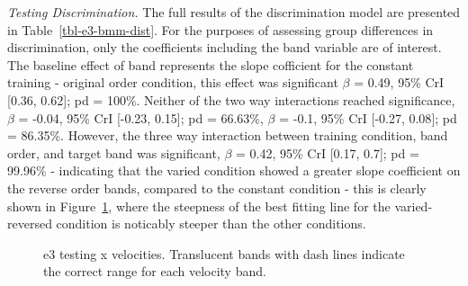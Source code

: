 \documentclass[
  12pt,
  letterpaper,
]{article}
\begin{document}
\emph{Testing Discrimination.} The full results of the discrimination
model are presented in Table~\ref{tbl-e3-bmm-dist}. For the purposes of
assessing group differences in discrimination, only the coefficients
including the band variable are of interest. The baseline effect of band
represents the slope cofficient for the constant training - original
order condition, this effect was significant \(\beta\) = 0.49, 95\% CrI
{[}0.36, 0.62{]}; pd = 100\%. Neither of the two way interactions
reached significance, \(\beta\) = -0.04, 95\% CrI {[}-0.23, 0.15{]}; pd
= 66.63\%, \(\beta\) = -0.1, 95\% CrI {[}-0.27, 0.08{]}; pd = 86.35\%.
However, the three way interaction between training condition, band
order, and target band was significant, \(\beta\) = 0.42, 95\% CrI
{[}0.17, 0.7{]}; pd = 99.96\% - indicating that the varied condition
showed a greater slope coefficient on the reverse order bands, compared
to the constant condition - this is clearly shown in
Figure~\ref{fig-e3-test-vx}, where the steepness of the best fitting
line for the varied-reversed condition is noticably steeper than the
other conditions.

\begin{figure}


\caption{\label{fig-e3-test-vx}e3 testing x velocities. Translucent
bands with dash lines indicate the correct range for each velocity
band.}

\end{figure}%
\end{document}
